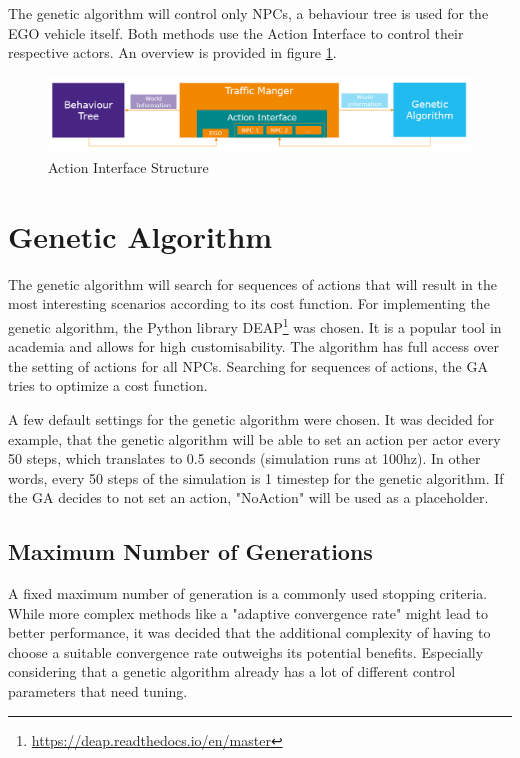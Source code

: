 The genetic algorithm will control only NPCs, a behaviour tree is used for the EGO vehicle itself. Both methods use the Action Interface to control their respective actors. An overview is provided in figure \ref{fig:implementation:traffic_manager_structure}.

\begin{figure}[ht] 
	\includegraphics[width=1\linewidth]{figures/tm_structure}
	\caption{Action Interface Structure}
	\label{fig:implementation:traffic_manager_structure}
\end{figure}

\section{Genetic Algorithm}
The genetic algorithm will search for sequences of actions that will result in the most interesting scenarios according to its cost function.
For implementing the genetic algorithm, the Python library DEAP\footnote{\url{https://deap.readthedocs.io/en/master}} was chosen. It is a popular tool in academia and allows for high customisability.
The algorithm has full access over the setting of actions for all NPCs. Searching for sequences of actions, the GA tries to optimize a cost function.

A few default settings for the genetic algorithm were chosen. It was decided for example, that the genetic algorithm will be able to set an action per actor every 50 steps, which translates to 0.5 seconds (simulation runs at 100hz). In other words, every 50 steps of the simulation is 1 timestep for the genetic algorithm. If the GA decides to not set an action, "NoAction" will be used as a placeholder.

\subsection{Maximum Number of Generations}
A fixed maximum number of generation is a commonly used stopping criteria. While more complex methods like a "adaptive convergence rate" might lead to better performance, it was decided that the additional complexity of having to choose a suitable convergence rate outweighs its potential benefits. Especially considering that a genetic algorithm already has a lot of different control parameters that need tuning.


